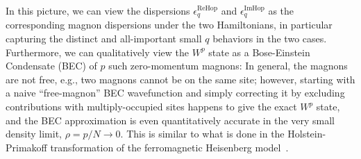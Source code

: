 \documentclass[prx,letterpaper,aps,superscriptaddress,floatfix,twocolumn,nofootinbib]{revtex4-2}
\theoremstyle{definition}
\begin{document}
%
In this picture, we can view the dispersions $\epsilon_q^{\text{ReHop}}$ and $\epsilon_q^{\text{ImHop}}$ as the corresponding magnon dispersions under the two Hamiltonians, in particular capturing the distinct and all-important small $q$ behaviors in the two cases.
%
Furthermore, we can qualitatively view the $W^p$ state as a Bose-Einstein Condensate (BEC) of $p$ such zero-momentum magnons:
%
In general, the magnons are not free, e.g., two magnons cannot be on the same site; however, starting with a naive ``free-magnon'' BEC wavefunction and simply correcting it by excluding contributions with multiply-occupied sites happens to give the exact $W^p$ state, and the BEC approximation is even quantitatively accurate in the very small density limit, $\rho = p/N \to 0$.
%
This is similar to what is done in the Holstein-Primakoff transformation of the ferromagnetic Heisenberg model~\cite{HolsteinPrimakoff1940}.
%
\end{document}
